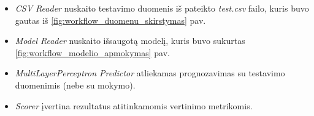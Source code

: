 \begin{itemize}
    \item \textit{CSV Reader} nuskaito testavimo duomenis iš pateikto \textit{test.csv} failo, kuris buvo gautas iš \ref{fig:workflow_duomenu_skirstymas} pav.
    \item \textit{Model Reader} nuskaito išsaugotą modelį, kuris buvo sukurtas \ref{fig:workflow_modelio_apmokymas} pav.
    \item \textit{MultiLayerPerceptron Predictor} atliekamas prognozavimas su testavimo duomenimis (nebe su mokymo).
    \item \textit{Scorer} įvertina rezultatus atitinkamomis vertinimo metrikomis.
\end{itemize}